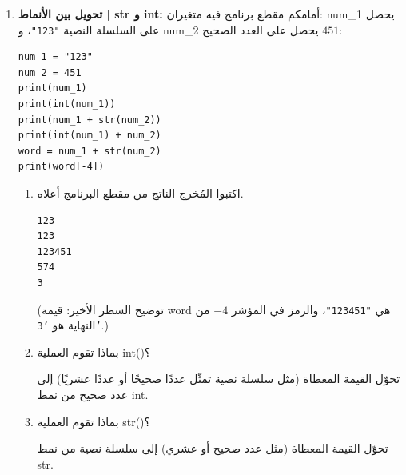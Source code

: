 \documentclass[14pt]{extarticle}
\begin{document}
\begin{enumerate}[resume, label=\textbf{تمرين \arabic*:}, wide=0pt, itemsep=2.2em]
\begin{enumerate}[label=\alph*.]
\item بماذا تقوم العملية \textenglish{len}؟
\ifwithsols
\begin{boxSolution}
تعيد طول السلسلة النصية، أي عدد جميع الرموز فيها (بما يشمل الحروف، الأرقام، الفراغات، وعلامات الترقيم).
\end{boxSolution}
\fi
\filbreak
\end{enumerate}
\filbreak

\item \textbf{تحويل بين الأنماط | \textenglish{str} و \textenglish{int}:}
أمامكم مقطع برنامج فيه متغيران: \textenglish{num\_1} يحصل على السلسلة النصية \textenglish{\texttt{"123"}}، و \textenglish{num\_2} يحصل على العدد الصحيح $451$:

\begin{boxCode}
\begin{english}
\begin{verbatim}
num_1 = "123"
num_2 = 451
print(num_1)
print(int(num_1))
print(num_1 + str(num_2))
print(int(num_1) + num_2)
word = num_1 + str(num_2)
print(word[-4])
\end{verbatim}
\end{english}
\end{boxCode}

\begin{enumerate}[label=\alph*.]
\item اكتبوا المُخرج الناتج من مقطع البرنامج أعلاه.
\ifwithsols
\begin{boxSolution}
\begin{english}
\begin{verbatim}
123
123
123451
574
3
\end{verbatim}
\end{english}
(توضيح السطر الأخير: قيمة \textenglish{word} هي \textenglish{\texttt{"123451"}}، والرمز في المؤشر $-4$ من النهاية هو \textenglish{\texttt{'3'}}.)
\end{boxSolution}
\fi
\filbreak

\item بماذا تقوم العملية \textenglish{int()}؟
\ifwithsols
\begin{boxSolution}
تحوّل القيمة المعطاة (مثل سلسلة نصية تمثّل عددًا صحيحًا أو عددًا عشريًا) إلى عدد صحيح من نمط \textenglish{int}.
\end{boxSolution}
\fi
\filbreak

\item بماذا تقوم العملية \textenglish{str()}؟
\ifwithsols
\begin{boxSolution}
تحوّل القيمة المعطاة (مثل عدد صحيح أو عشري) إلى سلسلة نصية من نمط \textenglish{str}.
\end{boxSolution}
\fi
\filbreak
\end{enumerate}
\filbreak


\end{enumerate}
\end{document}

